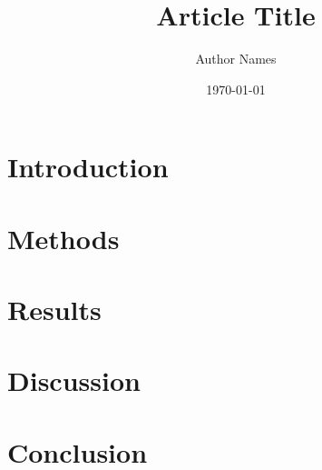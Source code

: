 \documentclass[12pt]{article}
\begin{document}
\title{Article Title}
\author{Author Names}
\date{\today}
\maketitle

\begin{abstract}
\end{abstract}

\section{Introduction}

\section{Methods}

\section{Results}

\section{Discussion}

\section{Conclusion}



\end{document}
